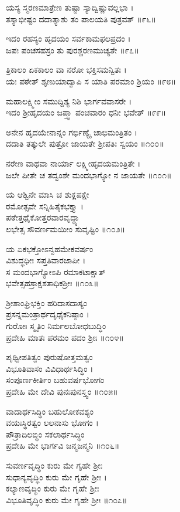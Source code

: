ಯಸ್ಯ ಸ್ಮರಣಮಾತ್ರೇಣ ತುಷ್ಟಾ ಸ್ಯಾದ್ವಿಷ್ಣುವಲ್ಲಭಾ ।\\
ತಸ್ಯಾಭೀಷ್ಟಂ ದದಾತ್ಯಾಶು ತಂ ಪಾಲಯತಿ ಪುತ್ರವತ್ ॥೯೬॥

ಇದಂ ರಹಸ್ಯಂ ಹೃದಯಂ ಸರ್ವಕಾಮಫಲಪ್ರದಂ ।\\
ಜಪಃ ಪಂಚಸಹಸ್ರಂ ತು ಪುರಶ್ಚರಣಮುಚ್ಯತೇ ॥೯೭॥

	ತ್ರಿಕಾಲಂ ಏಕಕಾಲಂ ವಾ ನರೋ ಭಕ್ತಿಸಮನ್ವಿತಃ ।\\
	ಯಃ ಪಠೇತ್ ಶೃಣುಯಾದ್ವಾಪಿ ಸ ಯಾತಿ ಪರಮಾಂ ಶ್ರಿಯಂ ॥೯೮॥

ಮಹಾಲಕ್ಷ್ಮೀಂ ಸಮುದ್ದಿಶ್ಯ ನಿಶಿ ಭಾರ್ಗವವಾಸರೇ ।\\
ಇದಂ ಶ್ರೀಹೃದಯಂ ಜಪ್ತ್ವಾ ಪಂಚವಾರಂ ಧನೀ ಭವೇತ್ ॥೯೯॥

	ಅನೇನ ಹೃದಯೇನಾನ್ನಂ ಗರ್ಭಿಣ್ಯೈ ಚಾಭಿಮಂತ್ರಿತಂ ।\\
	ದದಾತಿ ತತ್ಕುಲೇ ಪುತ್ರೋ ಜಾಯತೇ ಶ್ರೀಪತಿಃ ಸ್ವಯಂ ॥೧೦೦॥

ನರೇಣ ವಾಥವಾ ನಾರ್ಯಾ ಲಕ್ಷ್ಮೀಹೃದಯಮಂತ್ರಿತೇ ।\\
ಜಲೇ ಪೀತೇ ಚ ತದ್ವಂಶೇ ಮಂದಭಾಗ್ಯೋ ನ ಜಾಯತೇ ॥೧೦೧॥

ಯ ಆಶ್ವಿನೇ ಮಾಸಿ ಚ ಶುಕ್ಲಪಕ್ಷೇ\\ ರಮೋತ್ಸವೇ ಸನ್ನಿಹಿತೈಕಭಕ್ತ್ಯಾ ।\\
ಪಠೇತ್ತಥೈಕೋತ್ತರವಾರವೃದ್ಧ್ಯಾ\\ ಲಭೇತ್ಸ ಸೌವರ್ಣಮಯೀಂ ಸುವೃಷ್ಟಿಂ ॥೧೦೨॥

	ಯ ಏಕಭಕ್ತೋಽನ್ವಹಮೇಕವರ್ಷಂ\\ ವಿಶುದ್ಧಧೀಃ ಸಪ್ತತಿವಾರಜಾಪೀ ।\\
	ಸ ಮಂದಭಾಗ್ಯೋಽಪಿ ರಮಾಕಟಾಕ್ಷಾತ್\\ ಭವೇತ್ಸಹಸ್ರಾಕ್ಷಶತಾಧಿಕಶ್ರೀಃ ॥೧೦೩॥

ಶ್ರೀಶಾಂಘ್ರಿಭಕ್ತಿಂ ಹರಿದಾಸದಾಸ್ಯಂ \\ಪ್ರಸನ್ನಮಂತ್ರಾರ್ಥದೃಢೈಕನಿಷ್ಠಾಂ ।\\
ಗುರೋಃ ಸ್ಮೃತಿಂ ನಿರ್ಮಲಬೋಧಬುದ್ಧಿಂ\\ ಪ್ರದೇಹಿ ಮಾತಃ ಪರಮಂ ಪದಂ ಶ್ರೀಃ ॥೧೦೪॥

ಪೃಥ್ವೀಪತಿತ್ವಂ ಪುರುಷೋತ್ತಮತ್ವಂ \\ವಿಭೂತಿವಾಸಂ ವಿವಿಧಾರ್ಥಸಿದ್ಧಿಂ ।\\
ಸಂಪೂರ್ಣಕೀರ್ತಿಂ ಬಹುವರ್ಷಭೋಗಂ\\ ಪ್ರದೇಹಿ ಮೇ ದೇವಿ ಪುನಃಪುನಸ್ತ್ವಂ ॥೧೦೫॥

	ವಾದಾರ್ಥಸಿದ್ಧಿಂ ಬಹುಲೋಕವಶ್ಯಂ\\ ವಯಃಸ್ಥಿರತ್ವಂ ಲಲನಾಸು ಭೋಗಂ ।\\
	ಪೌತ್ರಾದಿಲಬ್ಧಿಂ ಸಕಲಾರ್ಥಸಿದ್ಧಿಂ \\ಪ್ರದೇಹಿ ಮೇ ಭಾರ್ಗವಿ ಜನ್ಮಜನ್ಮನಿ ॥೧೦೬॥

ಸುವರ್ಣವೃದ್ಧಿಂ ಕುರು ಮೇ ಗೃಹೇ ಶ್ರೀಃ\\ ಸುಧಾನ್ಯವೃದ್ಧಿಂ ಕುರು ಮೇ ಗೃಹೇ ಶ್ರೀಃ ।\\
ಕಲ್ಯಾಣವೃದ್ಧಿಂ ಕುರು ಮೇ ಗೃಹೇ ಶ್ರೀಃ \\ವಿಭೂತಿವೃದ್ಧಿಂ ಕುರು ಮೇ ಗೃಹೇ ಶ್ರೀಃ ॥೧೦೭॥


